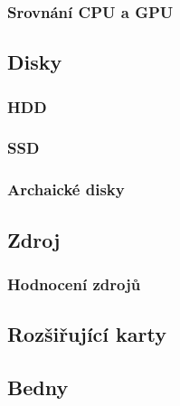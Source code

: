 \documentclass[a4paper]{article}
\begin{document}
        \subsubsection{Srovnání CPU a GPU}
    \subsection{Disky}
        \subsubsection{HDD}
        \subsubsection{SSD}
        \subsubsection{Archaické disky}
    \subsection{Zdroj}
        \subsubsection{Hodnocení zdrojů}
    \subsection{Rozšiřující karty}
    \subsection{Bedny}
\end{document}
